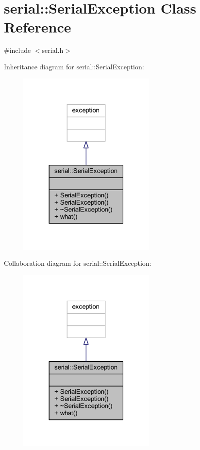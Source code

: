 \hypertarget{classserial_1_1_serial_exception}{}\section{serial\+:\+:Serial\+Exception Class Reference}
\label{classserial_1_1_serial_exception}


{\ttfamily \#include $<$serial.\+h$>$}



Inheritance diagram for serial\+:\+:Serial\+Exception\+:\nopagebreak
\begin{figure}[H]
\begin{center}
\leavevmode
\includegraphics[width=194pt]{classserial_1_1_serial_exception__inherit__graph}
\end{center}
\end{figure}


Collaboration diagram for serial\+:\+:Serial\+Exception\+:\nopagebreak
\begin{figure}[H]
\begin{center}
\leavevmode
\includegraphics[width=194pt]{classserial_1_1_serial_exception__coll__graph}
\end{center}
\end{figure}
